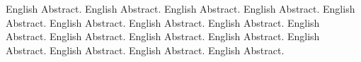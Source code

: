 \begin{englishabstract}

	English Abstract. English Abstract. English Abstract. English Abstract. English Abstract. English Abstract. English Abstract. English Abstract. English Abstract. English Abstract. English Abstract. English Abstract. English Abstract. English Abstract. English Abstract. English Abstract. 

	\noindent{}
\end{englishabstract}